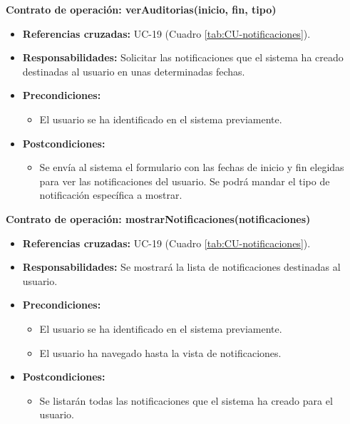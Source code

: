 \textbf{Contrato de operación: verAuditorias(inicio, fin, tipo)}
\begin{itemize}
\item \textbf{Referencias cruzadas:} UC-19 (Cuadro \ref{tab:CU-notificaciones}).
\item \textbf{Responsabilidades:} Solicitar las notificaciones que el sistema ha creado destinadas al usuario en unas determinadas fechas.
\item \textbf{Precondiciones:} 
 \begin{itemize}
\item El usuario se ha identificado en el sistema previamente.
\end {itemize}
\item \textbf{Postcondiciones:} 
 \begin{itemize}
\item Se envía al sistema el formulario con las fechas de inicio y fin elegidas para ver las notificaciones del usuario. Se podrá mandar el tipo de notificación específica a mostrar.
\end {itemize}
\end {itemize}

\textbf{Contrato de operación: mostrarNotificaciones(notificaciones)}
\begin{itemize}
\item \textbf{Referencias cruzadas:} UC-19 (Cuadro \ref{tab:CU-notificaciones}).
\item \textbf{Responsabilidades:} Se mostrará la lista de notificaciones destinadas al usuario.
\item \textbf{Precondiciones:} 
 \begin{itemize}
\item El usuario se ha identificado en el sistema previamente.
\item El usuario ha navegado hasta la vista de notificaciones.
\end {itemize}
\item \textbf{Postcondiciones:} 
 \begin{itemize}
\item Se listarán todas las notificaciones que el sistema ha creado para el usuario.
\end {itemize}
\end {itemize}


\vspace{10mm}

